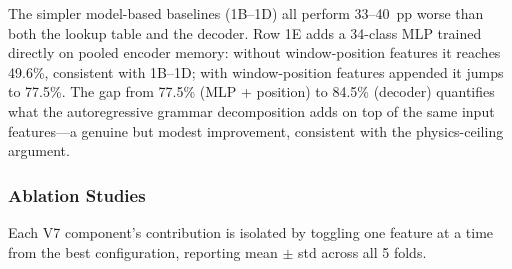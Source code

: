 \documentclass[sensors,article,submit,moreauthors,pdftex]{Definitions/mdpi}
\begin{document}
The simpler model-based baselines (1B--1D) all perform 33--40~pp worse than both the lookup table and the decoder. Row 1E adds a 34-class MLP trained directly on pooled encoder memory: without window-position features it reaches 49.6\%, consistent with 1B--1D; with window-position features appended it jumps to 77.5\%. The gap from 77.5\% (MLP + position) to 84.5\% (decoder) quantifies what the autoregressive grammar decomposition adds on top of the same input features---a genuine but modest improvement, consistent with the physics-ceiling argument.

\subsubsection{Ablation Studies}
\label{sec:ablations}

Each V7 component's contribution is isolated by toggling one feature at a time from the best configuration, reporting mean $\pm$ std across all 5 folds.
\end{document}
